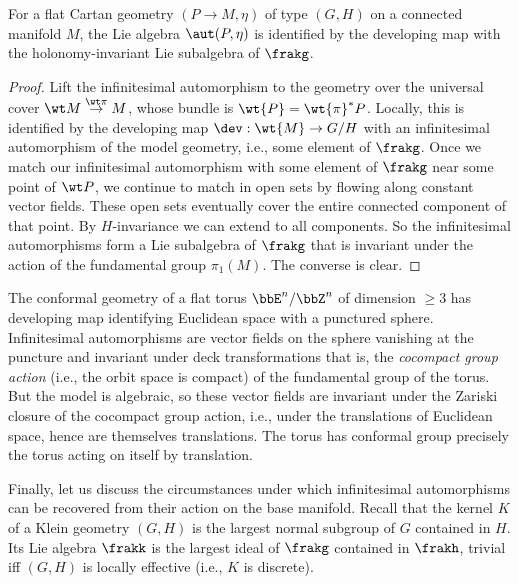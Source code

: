 \begin{prop}
    For a flat Cartan geometry $(P\to M,\eta)$ of type $(G,H)$ on a connected manifold $M$, the Lie algebra $\aut(P,\eta)$ is identified by the developing map with the holonomy-invariant Lie subalgebra of $\frakg$.
\end{prop}
\begin{proof}
    Lift the infinitesimal automorphism to the geometry over the universal cover $\wt M\overset{\wt\pi}{\to}M$, whose bundle is $\wt{P}=\wt{\pi}^\ast P$. Locally, this is identified by the developing map $\dev:\wt{M}\to G\slash H$ with an infinitesimal automorphism of the model geometry, i.e., some element of $\frakg$. Once we match our infinitesimal automorphism with some element of $\frakg$ near some point of $\wt P$, we continue to match in open sets by flowing along constant vector fields. These open sets eventually cover the entire connected component of that point. By $H$-invariance we can extend to all components. So the infinitesimal automorphisms form a Lie subalgebra of $\frakg$ that is invariant under the action of the fundamental group $\pi_1(M)$. The converse is clear.
\end{proof}

\begin{example}
    The conformal geometry of a flat torus $\bbE^n\slash \bbZ^n$ of dimension $\geq 3$ has developing map identifying Euclidean space with a punctured sphere. Infinitesimal automorphisms are vector fields on the sphere vanishing at the puncture and invariant under deck transformations that is, the \emph{cocompact group action} (i.e., the orbit space is compact) of the fundamental group of the torus. But the model is algebraic, so these vector fields are invariant under the Zariski closure of the cocompact group action, i.e., under the translations of Euclidean space, hence are themselves translations. The torus has conformal group precisely the torus acting on itself by translation. 
\end{example}

Finally, let us discuss the circumstances under which infinitesimal automorphisms can be recovered from their action on the base manifold. Recall that the kernel $K$ of a Klein geometry $(G,H)$ is the largest normal subgroup of $G$ contained in $H$. Its Lie algebra $\frakk$ is the largest ideal of $\frakg$ contained in $\frakh$, trivial iff $(G,H)$ is locally effective (i.e., $K$ is discrete).


